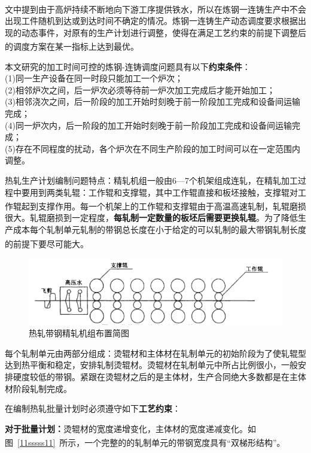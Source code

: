 \documentclass{whutmod}
\newcommand{\upcite}[1]{\textsuperscript{\cite{#1}}}
\begin{document}
文\upcite{3}中提到由于高炉持续不断地向下游工序提供铁水，所以在炼钢一连铸生产中不会出现工件随机到达或到达时间不确定的情况。炼钢一连铸生产动态调度要求根据出现的动态事件，对原有的生产计划进行调整，使得在满足工艺约束的前提下调整后的调度方案在某一指标上达到最优\upcite{3}。

本文研究的加工时间可控的炼钢-连铸调度问题具有以下\textbf{约束条件}：\\
(1)同一生产设备在同一时段只能加工一个炉次；\\
(2)相邻炉次之间，后一炉次必须等待前一炉次加工完成后才能开始加工；\\
(3)相邻浇次之间，后一阶段的加工开始时刻晚于前一阶段加工完成和设备间运输完成；\\
(4)同一炉次内，后一阶段的加工开始时刻晚于前一阶段加工完成和设备间运输完成；\\
(5)存在不同程度的扰动，各个炉次在不同生产阶段的加工时间可以在一定范围内调整。

热轧生产计划编制问题特点：精轧机组一般由6—7个机架组成连轧，在精轧加工过程中要用到两类轧辊：工作辊和支撑辊，其中工作辊直接和板坯接触，支撑辊对工作辊起到支撑作用\upcite{5}。每一个机架上的工作辊和支撑辊由于高温高速轧制，轧辊磨损很大。轧辊磨损到一定程度，\textbf{每轧制一定数量的板坯后需要更换轧辊}。为了降低生产成本每个轧制单元轧制的带钢总长度在小于给定的可以轧制的最大带钢轧制长度的前提下要尽可能大\upcite{5}。
\begin{figure}[H]
\centering
\includegraphics[width=1.05\textwidth]{figures/demo.png}
\caption{热轧带钢精轧机组布置简图}\label{1111sssss11}
\end{figure}

每个轧制单元由两部分组成：烫辊材和主体材在轧制单元的初始阶段为了使轧辊型达到热平衡和稳定，安排轧制烫辊材。烫辊材在轧制单元中所占比例很小，一般安排硬度较低的带钢。紧跟在烫辊材之后的是主体材，生产合同绝大多数都是在主体材阶段轧制完成。

在编制热轧批量计划时必须遵守如下\textbf{工艺约束}：
                            
\textbf{对于批量计划：}烫辊材的宽度递增变化，主体材的宽度递减变化。如图~\ref{11sssss11}~所示，一个完整的的轧制单元的带钢宽度具有“双梯形结构”\upcite{6}。
\end{document}
